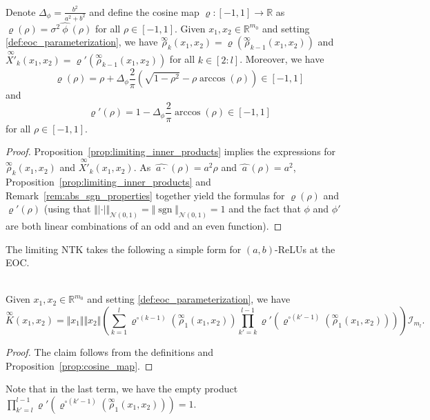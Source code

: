 \documentclass[twoside,11pt]{article}
\newcommand{\R}{\mathbb{R}}
\newcommand{\Id}{\mathcal{I}}
\newcommand{\dual}[1]{\widehat{\ #1 \ }}
\newcommand{\limiting}[1]{\overset{\scriptscriptstyle\infty}{#1}}
\DeclareMathOperator{\sgn}{sgn}
\begin{document}
\begin{proposition}\label{prop:cosine_map}~\\
Denote $\Delta_\phi = \frac{b^2}{a^2+b^2}$ and define the cosine map $\varrho : [-1,1] \to \R$ as $\varrho(\rho) = \sigma^2 \dual{\phi}(\rho)$ for all $\rho \in [-1,1]$. Given $x_1,x_2 \in \R^{m_0}$ and setting \eqref{def:eoc_parameterization}, we have $\limiting{\rho}_k(x_1,x_2) = \varrho(\limiting{\rho}_{k-1}(x_1,x_2))$ and $\limiting{X'}_k(x_1,x_2) = \varrho'(\limiting{\rho}_{k-1}(x_1,x_2))$ for all $k \in [2:l]$. Moreover, we have
\[
\varrho(\rho) 
= \rho + \Delta_\phi \frac{2}{\pi}\left( \sqrt{1-\rho^2} - \rho\arccos(\rho) \right) \in [-1,1]
\]
and
\[
\varrho'(\rho) 
= 1 - \Delta_\phi \frac{2}{\pi}\arccos(\rho) \in [-1,1] 
\] 
for all $\rho \in [-1,1]$. 
\end{proposition}
\begin{proof}
Proposition~\ref{prop:limiting_inner_products} implies the expressions for $\limiting{\rho}_k(x_1,x_2)$ and $\limiting{X'}_k(x_1,x_2)$. As $\dual{a \cdot}(\rho) = a^2 \rho$ and $\dual{a}(\rho) = a^2$, Proposition~\ref{prop:limiting_inner_products} and Remark~\ref{rem:abs_sgn_properties} together yield the formulas for $\varrho(\rho)$ and $\varrho'(\rho)$ (using that $\Vert \vert\cdot\vert \Vert_{\mathcal{N}(0,1)} = \Vert \sgn \Vert_{\mathcal{N}(0,1)} = 1$ and the fact that $\phi$ and $\phi'$ are both linear combinations of an odd and an even function).
\end{proof}

The limiting NTK takes the following a simple form for $(a,b)$-ReLUs at the EOC.

\begin{proposition}[$\limiting{K}$ at the EOC]\label{prop:limiting_ntk_at_eoc}~\\
Given $x_1,x_2 \in \R^{m_0}$ and setting \eqref{def:eoc_parameterization}, we have
\[
\limiting{K}(x_1,x_2) = \Vert x_1 \Vert \Vert x_2 \Vert \left( \sum_{k=1}^l \varrho^{\circ (k-1)}\left( \limiting{\rho}_1(x_1,x_2) \right) \prod_{k'=k}^{l-1} \varrho'\left( \varrho^{\circ (k'-1)}\left( \limiting{\rho}_1(x_1,x_2) \right) \right) \right) \Id_{m_l}.
\]
\end{proposition}
\begin{proof}
The claim follows from the definitions and Proposition~\ref{prop:cosine_map}.
\end{proof}
Note that in the last term, we have the empty product $\prod_{k'=l}^{l-1} \varrho'(\varrho^{\circ (k'-1)}(\limiting{\rho}_1(x_1,x_2))) = 1$.
\end{document}
